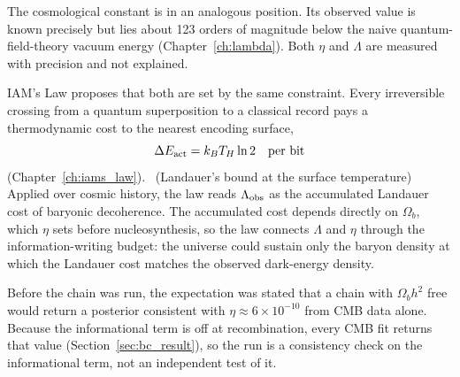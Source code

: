The cosmological constant is in an analogous position. Its observed value is known precisely but lies about 123 orders of magnitude below
the naive quantum-field-theory vacuum energy (Chapter~\ref{ch:lambda}). Both $\eta$ and $\Lambda$ are measured with precision and not
explained. \observed

IAM's Law proposes that both are set by the same constraint. Every irreversible crossing from a quantum superposition to a classical
record pays a thermodynamic cost to the nearest encoding surface,
\begin{equation}\Delta E_{\rm act}=k_BT_H\ln2\quad\text{per bit}\label{eq:bc_law}\end{equation}
(Chapter~\ref{ch:iams_law}). \derived\ (Landauer's bound at the surface temperature) Applied over cosmic history, the law reads
$\Lambda_{\rm obs}$ as the accumulated Landauer cost of baryonic decoherence. The accumulated cost depends directly on $\Omega_b$, which
$\eta$ sets before nucleosynthesis, so the law connects $\Lambda$ and $\eta$ through the information-writing budget: the universe could
sustain only the baryon density at which the Landauer cost matches the observed dark-energy density. \conjecture

Before the chain was run, the expectation was stated that a chain with $\Omega_bh^2$ free would return a posterior consistent with
$\eta\approx6\times10^{-10}$ from CMB data alone. Because the informational term is off at recombination, every CMB fit returns that
value (Section~\ref{sec:bc_result}), so the run is a consistency check on the informational term, not an independent test of it. \interp

